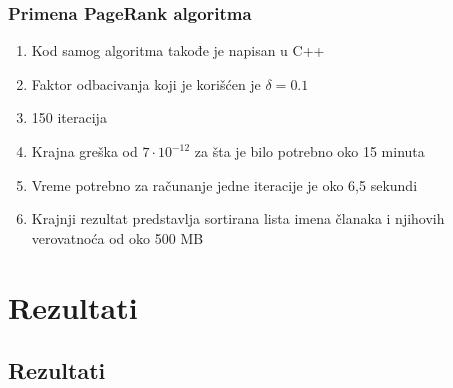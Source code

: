 \documentclass[11pt]{beamer}
\begin{document}
\begin{frame}
    \frametitle{Primena PageRank algoritma}
  		\begin{center}
        \begin{enumerate}
        \item Kod samog algoritma takođe je napisan u C++
        \item Faktor odbacivanja koji je korišćen je $\delta = 0.1$
        \item 150 iteracija
        \item Krajna greška od $7 \cdot 10^{-12}$ za šta je bilo potrebno oko 15 minuta
        \item Vreme potrebno za računanje jedne iteracije je oko 6,5 sekundi
        \item Krajnji rezultat predstavlja sortirana lista imena članaka i njihovih verovatnoća od oko 500 MB
        \end{enumerate}
        \end{center}
\end{frame}

\section{Rezultati}
\subsection{Rezultati}
\end{document}
